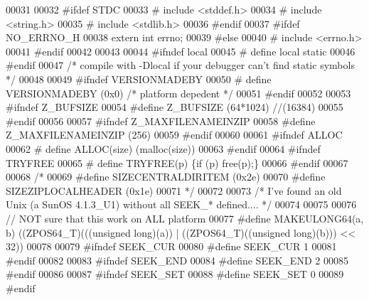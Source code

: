 \begin{DoxyCode}
00031 
00032 \textcolor{preprocessor}{#ifdef STDC}
00033 \textcolor{preprocessor}{#  include <stddef.h>}
00034 \textcolor{preprocessor}{#  include <string.h>}
00035 \textcolor{preprocessor}{#  include <stdlib.h>}
00036 \textcolor{preprocessor}{#endif}
00037 \textcolor{preprocessor}{#ifdef NO\_ERRNO\_H}
00038     \textcolor{keyword}{extern} \textcolor{keywordtype}{int} errno;
00039 \textcolor{preprocessor}{#else}
00040 \textcolor{preprocessor}{#   include <errno.h>}
00041 \textcolor{preprocessor}{#endif}
00042 
00043 
00044 \textcolor{preprocessor}{#ifndef local}
00045 \textcolor{preprocessor}{#  define local static}
00046 \textcolor{preprocessor}{#endif}
00047 \textcolor{comment}{/* compile with -Dlocal if your debugger can't find static symbols */}
00048 
00049 \textcolor{preprocessor}{#ifndef VERSIONMADEBY}
00050 \textcolor{preprocessor}{# define VERSIONMADEBY   (0x0) }\textcolor{comment}{/* platform depedent */}\textcolor{preprocessor}{}
00051 \textcolor{preprocessor}{#endif}
00052 
00053 \textcolor{preprocessor}{#ifndef Z\_BUFSIZE}
00054 \textcolor{preprocessor}{#define Z\_BUFSIZE (64*1024) //(16384)}
00055 \textcolor{preprocessor}{#endif}
00056 
00057 \textcolor{preprocessor}{#ifndef Z\_MAXFILENAMEINZIP}
00058 \textcolor{preprocessor}{#define Z\_MAXFILENAMEINZIP (256)}
00059 \textcolor{preprocessor}{#endif}
00060 
00061 \textcolor{preprocessor}{#ifndef ALLOC}
00062 \textcolor{preprocessor}{# define ALLOC(size) (malloc(size))}
00063 \textcolor{preprocessor}{#endif}
00064 \textcolor{preprocessor}{#ifndef TRYFREE}
00065 \textcolor{preprocessor}{# define TRYFREE(p) \{if (p) free(p);\}}
00066 \textcolor{preprocessor}{#endif}
00067 
00068 \textcolor{comment}{/*}
00069 \textcolor{comment}{#define SIZECENTRALDIRITEM (0x2e)}
00070 \textcolor{comment}{#define SIZEZIPLOCALHEADER (0x1e)}
00071 \textcolor{comment}{*/}
00072 
00073 \textcolor{comment}{/* I've found an old Unix (a SunOS 4.1.3\_U1) without all SEEK\_* defined.... */}
00074 
00075 
00076 \textcolor{comment}{// NOT sure that this work on ALL platform}
00077 \textcolor{preprocessor}{#define MAKEULONG64(a, b) ((ZPOS64\_T)(((unsigned long)(a)) | ((ZPOS64\_T)((unsigned long)(b))) << 32))}
00078 
00079 \textcolor{preprocessor}{#ifndef SEEK\_CUR}
00080 \textcolor{preprocessor}{#define SEEK\_CUR    1}
00081 \textcolor{preprocessor}{#endif}
00082 
00083 \textcolor{preprocessor}{#ifndef SEEK\_END}
00084 \textcolor{preprocessor}{#define SEEK\_END    2}
00085 \textcolor{preprocessor}{#endif}
00086 
00087 \textcolor{preprocessor}{#ifndef SEEK\_SET}
00088 \textcolor{preprocessor}{#define SEEK\_SET    0}
00089 \textcolor{preprocessor}{#endif}

\end{DoxyCode}

